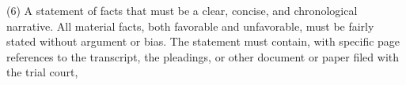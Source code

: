 \documentclass[12pt,\documentclassflag]{michiganCourtOfAppealsBrief}
\newcommand{\cmark}{\ding{51}}%
\newcommand{\xmark}{\ding{55}}%
\newcommand{\done}{\rlap{$\square$}{\raisebox{2pt}{\large\hspace{1pt}\cmark}}%
\hspace{-2.5pt}}
\newcommand{\wontfix}{\rlap{$\square$}{\large\hspace{1pt}\xmark}}
\begin{document}
\begin{todolist}

      




  
      \item
      (6) A statement of facts that must be a clear, concise, and chronological narrative. All material facts, both favorable and unfavorable, must be fairly stated without argument or bias. The statement must contain, with specific page references to the transcript, the pleadings, or other document or paper filed with the trial court,


\end{todolist}
\end{document}
